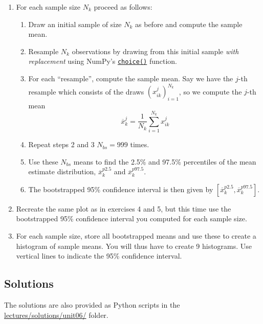 \documentclass{scrartcl}
\providecommand{\tightlist}{%
      \setlength{\itemsep}{0pt}\setlength{\parskip}{0pt}}
\begin{document}
\begin{enumerate}
\def\labelenumi{\arabic{enumi}.}
\tightlist
\item
  For each sample size \(N_k\) proceed as follows:

  \begin{enumerate}
  \def\labelenumii{\arabic{enumii}.}
  \tightlist
  \item
    Draw an initial sample of size \(N_k\) as before and compute the
    sample mean.
  \item
    Resample \(N_k\) observations by drawing from this initial sample
    \emph{with}\\
    \emph{replacement} using NumPy's
    \href{https://numpy.org/doc/stable/reference/random/generated/numpy.random.Generator.choice.html}{\texttt{choice()}}
    function.
  \item
    For each ``resample'', compute the sample mean. Say we have the
    \(j\)-th resample which consists of the draws
    \((x_{ik}^j)_{i=1}^{N_k}\), so we compute the \(j\)-th mean \[
    \overline{x}_{k}^j = \frac{1}{N_k} \sum_{i=1}^{N_k} x_{ik}^j
    \]
  \item
    Repeat steps 2 and 3 \(N_{bs} = 999\) times.
  \item
    Use these \(N_{bs}\) means to find the 2.5\% and 97.5\% percentiles
    of the mean estimate distribution, \(\overline{x}_k^{p2.5}\) and
    \(\overline{x}_k^{p97.5}\).
  \item
    The bootstrapped 95\% confidence interval is then given by
    \(\left[\overline{x}_k^{p2.5}, \overline{x}_k^{p97.5}\right]\).
  \end{enumerate}
\item
  Recreate the same plot as in exercises 4 and 5, but this time use the
  bootstrapped 95\% confidence interval you computed for each sample
  size.
\item
  For each sample size, store all bootstrapped means and use these to
  create a histogram of sample means. You will thus have to create 9
  histograms. Use vertical lines to indicate the 95\% confidence
  interval.
\end{enumerate}


\hypertarget{solutions}{%
\subsection{Solutions}\label{solutions}}

The solutions are also provided as Python scripts in the
\href{../lectures/solutions/unit06}{lectures/solutions/unit06/} folder.
\end{document}
